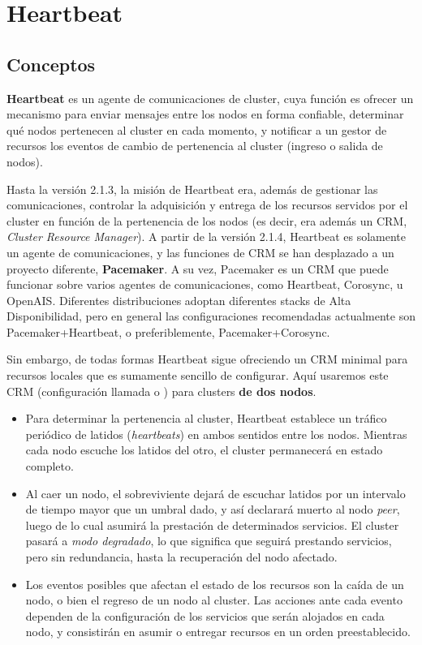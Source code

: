 

\section{Heartbeat}


\subsection{Conceptos}
\textbf{Heartbeat} es un agente de comunicaciones de cluster, cuya función es ofrecer un mecanismo para enviar mensajes entre los nodos en forma confiable, determinar qué nodos pertenecen al cluster en cada momento, y notificar a un gestor de recursos los eventos de cambio de pertenencia al cluster (ingreso o salida de nodos). 


Hasta la versión 2.1.3, la misión de Heartbeat era, además de gestionar las comunicaciones, controlar la adquisición y entrega de los recursos servidos por el cluster en función de la pertenencia de los nodos (es decir, era además un CRM, \textit{Cluster Resource Manager}). A partir de la versión 2.1.4, Heartbeat es solamente un agente de comunicaciones, y las funciones de CRM se han desplazado a un proyecto diferente, \textbf{Pacemaker}. A su vez, Pacemaker es un CRM que puede funcionar sobre varios agentes de comunicaciones, como Heartbeat, Corosync, u OpenAIS. Diferentes distribuciones adoptan diferentes stacks de Alta Disponibilidad, pero en general las configuraciones recomendadas actualmente son Pacemaker+Heartbeat, o preferiblemente, Pacemaker+Corosync. 

Sin embargo, de todas formas Heartbeat sigue ofreciendo un CRM minimal para recursos locales que es sumamente sencillo de configurar. Aquí usaremos este CRM (configuración llamada  o ) para clusters \textbf{de dos nodos}.

\begin{itemize}
	\item Para determinar la pertenencia al cluster, Heartbeat establece un tráfico periódico de latidos (\textit{heartbeats}) en ambos sentidos entre los nodos. Mientras cada nodo escuche los latidos del otro, el cluster permanecerá en estado completo.  

\item Al caer un nodo, el sobreviviente dejará de escuchar latidos por un intervalo de tiempo mayor que un umbral dado, y así declarará muerto al nodo \textit{peer}, luego de lo cual asumirá la prestación de determinados servicios. El cluster pasará a \textit{modo degradado}, lo que significa que seguirá prestando servicios, pero sin redundancia, hasta la recuperación del nodo afectado.
 
\item Los eventos posibles que afectan el estado de los recursos son la caída de un nodo, o bien el regreso de un nodo al cluster. Las acciones ante cada evento dependen de la configuración de los servicios que serán alojados en cada nodo, y consistirán en asumir o entregar recursos en un orden preestablecido. 

		\end{itemize}




